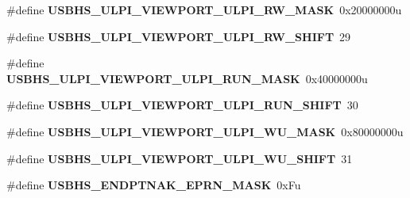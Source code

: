 \begin{DoxyCompactItemize}
\item 
\hypertarget{group___u_s_b_h_s___register___masks_gafe049c476699716d6d7870312eb9d8ee}{}\#define {\bfseries U\+S\+B\+H\+S\+\_\+\+U\+L\+P\+I\+\_\+\+V\+I\+E\+W\+P\+O\+R\+T\+\_\+\+U\+L\+P\+I\+\_\+\+R\+W\+\_\+\+M\+A\+S\+K}~0x20000000u\label{group___u_s_b_h_s___register___masks_gafe049c476699716d6d7870312eb9d8ee}

\item 
\hypertarget{group___u_s_b_h_s___register___masks_ga69698dd722a8c1b86407be9d7017bb39}{}\#define {\bfseries U\+S\+B\+H\+S\+\_\+\+U\+L\+P\+I\+\_\+\+V\+I\+E\+W\+P\+O\+R\+T\+\_\+\+U\+L\+P\+I\+\_\+\+R\+W\+\_\+\+S\+H\+I\+F\+T}~29\label{group___u_s_b_h_s___register___masks_ga69698dd722a8c1b86407be9d7017bb39}

\item 
\hypertarget{group___u_s_b_h_s___register___masks_gaefbf9cf4c946375effd01ef07be6adaa}{}\#define {\bfseries U\+S\+B\+H\+S\+\_\+\+U\+L\+P\+I\+\_\+\+V\+I\+E\+W\+P\+O\+R\+T\+\_\+\+U\+L\+P\+I\+\_\+\+R\+U\+N\+\_\+\+M\+A\+S\+K}~0x40000000u\label{group___u_s_b_h_s___register___masks_gaefbf9cf4c946375effd01ef07be6adaa}

\item 
\hypertarget{group___u_s_b_h_s___register___masks_ga2c9d3387a86971bb47348f481ea8791f}{}\#define {\bfseries U\+S\+B\+H\+S\+\_\+\+U\+L\+P\+I\+\_\+\+V\+I\+E\+W\+P\+O\+R\+T\+\_\+\+U\+L\+P\+I\+\_\+\+R\+U\+N\+\_\+\+S\+H\+I\+F\+T}~30\label{group___u_s_b_h_s___register___masks_ga2c9d3387a86971bb47348f481ea8791f}

\item 
\hypertarget{group___u_s_b_h_s___register___masks_ga5c95dde75626b3d62862d8b942f8d619}{}\#define {\bfseries U\+S\+B\+H\+S\+\_\+\+U\+L\+P\+I\+\_\+\+V\+I\+E\+W\+P\+O\+R\+T\+\_\+\+U\+L\+P\+I\+\_\+\+W\+U\+\_\+\+M\+A\+S\+K}~0x80000000u\label{group___u_s_b_h_s___register___masks_ga5c95dde75626b3d62862d8b942f8d619}

\item 
\hypertarget{group___u_s_b_h_s___register___masks_gaf1398f560ca8d1e3e6775abe7c657818}{}\#define {\bfseries U\+S\+B\+H\+S\+\_\+\+U\+L\+P\+I\+\_\+\+V\+I\+E\+W\+P\+O\+R\+T\+\_\+\+U\+L\+P\+I\+\_\+\+W\+U\+\_\+\+S\+H\+I\+F\+T}~31\label{group___u_s_b_h_s___register___masks_gaf1398f560ca8d1e3e6775abe7c657818}

\item 
\hypertarget{group___u_s_b_h_s___register___masks_gabb8a94e3cb8037d21629b5245a3cca6b}{}\#define {\bfseries U\+S\+B\+H\+S\+\_\+\+E\+N\+D\+P\+T\+N\+A\+K\+\_\+\+E\+P\+R\+N\+\_\+\+M\+A\+S\+K}~0x\+Fu\label{group___u_s_b_h_s___register___masks_gabb8a94e3cb8037d21629b5245a3cca6b}


\end{DoxyCompactItemize}
